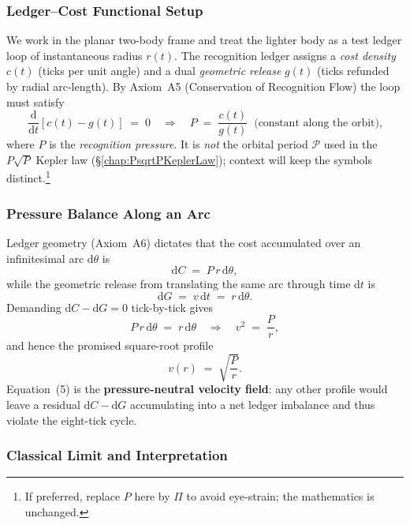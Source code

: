 \documentclass[11pt,oneside]{book}
\begin{document}
\subsubsection{Ledger–Cost Functional Setup}
\label{ss:pressure-cost-setup}

We work in the planar two-body frame and treat the lighter body as a
test ledger loop of instantaneous radius $r(t)$.  
The recognition ledger assigns a \emph{cost density}
\(c(t)\) (ticks per unit angle) and a dual \emph{geometric release}
\(g(t)\) (ticks refunded by radial arc‐length).  
By Axiom~A5 (Conservation of Recognition Flow) the loop must satisfy
\[
   \frac{\mathrm d}{\mathrm dt}\!\left[c(t)-g(t)\right]
   \;=\;0
   \quad\Longrightarrow\quad
   P
   \;=\;
   \frac{c(t)}{g(t)}
   \;\;\text{(constant along the orbit),}
   \tag{1}
\]
where \(P\) is the \emph{recognition pressure}.  It is \emph{not}
the orbital period $\mathscr{P}$ used in the
$P\sqrt{P}$ Kepler law (§\ref{chap:PsqrtPKeplerLaw}); context will
keep the symbols distinct.\footnote{If preferred, replace $P$ here by
$\Pi$ to avoid eye-strain; the mathematics is unchanged.}

\subsubsection{Pressure Balance Along an Arc}
\label{ss:pressure-balance}

Ledger geometry (Axiom~A6) dictates that the cost accumulated over an
infinitesimal arc $\mathrm d\theta$ is
\[
   \mathrm dC
   \;=\;
   P\,r\,\mathrm d\theta,
   \tag{2}
\]
while the geometric release from translating the same arc through time
$\mathrm dt$ is
\[
   \mathrm dG
   \;=\;
   v\,\mathrm dt
   \;=\;
   r\,\mathrm d\theta.
   \tag{3}
\]
Demanding $\mathrm dC-\mathrm dG=0$ tick-by-tick gives
\[
   P\,r\,\mathrm d\theta
   \;=\;
   r\,\mathrm d\theta
   \quad\Longrightarrow\quad
   v^{2}
   \;=\;
   \frac{P}{r},
   \tag{4}
\]
and hence the promised square-root profile
\[
   v(r)
   \;=\;
   \sqrt{\frac{P}{r}}.
   \tag{5}
\]
Equation~(5) is the \textbf{pressure-neutral velocity field}: any
other profile would leave a residual $\mathrm dC-\mathrm dG$
accumulating into a net ledger imbalance and thus violate the
eight-tick cycle.

\subsubsection{Classical Limit and Interpretation}
\label{ss:classical-limit}
\end{document}
